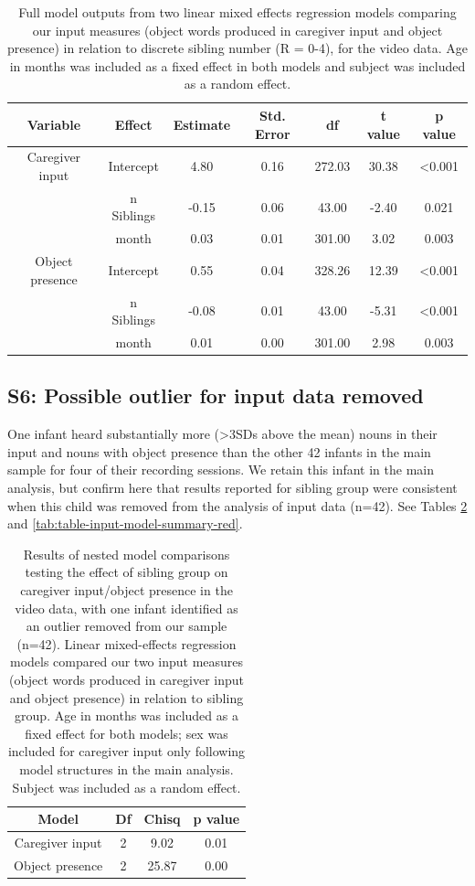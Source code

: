 \documentclass[
  man,mask,floatsintext]{apa6}
\begin{document}
\begin{longtable}[t]{ccccccc}
\caption{\label{tab:table-input-model-summary-discrete}Full model outputs from two linear mixed effects regression models comparing our input measures (object words produced in caregiver input and object presence) in relation to discrete sibling number (R = 0-4), for the video data. Age in months was included as a fixed effect in both models and subject was included as a random effect.}\\
\toprule
Variable & Effect & Estimate & Std. Error & df & t value & p value\\
\midrule
Caregiver input & Intercept & 4.80 & 0.16 & 272.03 & 30.38 & <0.001\\
 & n Siblings & -0.15 & 0.06 & 43.00 & -2.40 & 0.021\\
 & month & 0.03 & 0.01 & 301.00 & 3.02 & 0.003\\
\midrule
Object presence & Intercept & 0.55 & 0.04 & 328.26 & 12.39 & <0.001\\
 & n Siblings & -0.08 & 0.01 & 43.00 & -5.31 & <0.001\\
\addlinespace
 & month & 0.01 & 0.00 & 301.00 & 2.98 & 0.003\\
\bottomrule
\end{longtable}

\newpage

\hypertarget{s6-possible-outlier-for-input-data-removed}{%
\subsection{S6: Possible outlier for input data removed}\label{s6-possible-outlier-for-input-data-removed}}

One infant heard substantially more (\textgreater3SDs above the mean) nouns in their input and nouns with object presence than the other 42 infants in the main sample for four of their recording sessions. We retain this infant in the main analysis, but confirm here that results reported for sibling group were consistent when this child was removed from the analysis of input data (n=42). See Tables \ref{tab:table-model-comparisons-red} and \ref{tab:table-input-model-summary-red}.

\begin{longtable}[t]{cccc}
\caption{\label{tab:table-model-comparisons-red}Results of nested model comparisons testing the effect of sibling group on caregiver input/object presence in the video data, with one infant identified as an outlier removed from our sample (n=42). Linear mixed-effects regression models compared our two input measures (object words produced in caregiver input  and object presence) in relation to sibling group. Age in months was included as a fixed effect for both models; sex was included for caregiver input only following model structures in the main analysis. Subject was included as a random effect.}\\
\toprule
Model & Df & Chisq & p value\\
\midrule
Caregiver input & 2 & 9.02 & 0.01\\
Object presence & 2 & 25.87 & 0.00\\
\bottomrule
\end{longtable}
\end{document}
